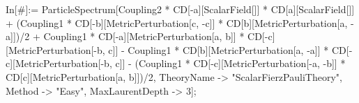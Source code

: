 In[\#]:= ParticleSpectrum[Coupling2 * CD[-a][ScalarField[]] * CD[a][ScalarField[]] + (Coupling1 * CD[-b][MetricPerturbation[c, -c]] * CD[b][MetricPerturbation[a, -a]])/2 + Coupling1 * CD[-a][MetricPerturbation[a, b]] * CD[-c][MetricPerturbation[-b, c]] - Coupling1 * CD[b][MetricPerturbation[a, -a]] * CD[-c][MetricPerturbation[-b, c]] - (Coupling1 * CD[-c][MetricPerturbation[-a, -b]] * CD[c][MetricPerturbation[a, b]])/2, TheoryName -> "ScalarFierzPauliTheory", Method -> "Easy", MaxLaurentDepth -> 3]; 
